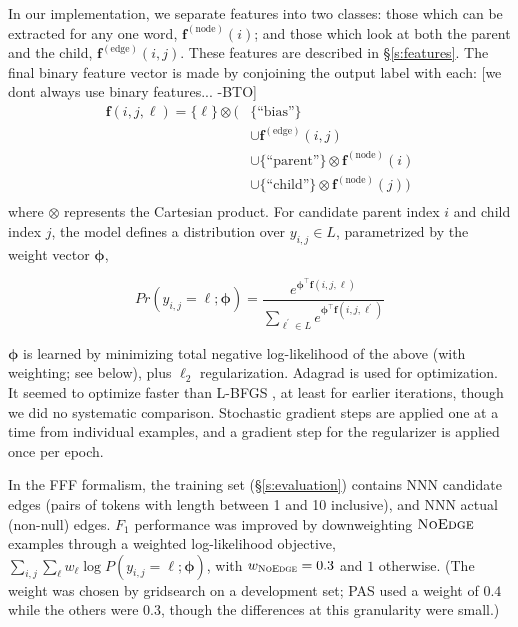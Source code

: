 \documentclass[11pt]{article}
\newcommand{\bocomment}[1]{\textcolor{Bittersweet}{[#1 -BTO]}}
\newcommand{\noedge}{\textsc{NoEdge}}
\begin{document}
In our implementation, we separate features into two classes:
those which can be extracted for any one word, $\bm{f}^{(\text{node})}(i)$;
and those which look at both the parent and the child,
$\bm{f}^{(\text{edge})}(i, j)$.
These features are described in \S\ref{s:features}.
The final binary feature vector is made by conjoining the output label with
each:
\bocomment{we dont always use binary features...}
\begin{align*} 
\bm{f}(i, j, \ell) =
\{ \ell \} \otimes (& 
	\{ \text{``bias''} \} \\
	& \cup \bm{f}^{(\text{edge})}(i, j) \\
	& \cup \{ \text{``parent''} \} \otimes \bm{f}^{(\text{node})}(i) \\
	& \cup \{ \text{``child''} \} \otimes \bm{f}^{(\text{node})}(j)
)\\
\end{align*}
\noindent
where  $\otimes$ represents the Cartesian product.
For candidate parent index $i$ and child index $j$, the model defines a
distribution over $y_{i,j} \in L$, parametrized by the weight vector $\bm\phi$,

\begin{equation}
  Pr(y_{i,j}=\ell; \bm\phi)  = \frac{
  	e^{\bm\phi^\top \bm{f}(i, j, \ell)}
  } {
  	\sum_{\ell^\prime \in L} {
  		e^{\bm\phi^\top \bm{f}(i, j, \ell^\prime)}
  	}
  }
\end{equation}

\noindent
$\bm\phi$ is learned by minimizing total negative log-likelihood of the above
(with weighting; see below), plus $\ell_2$ regularization.
Adagrad \cite{duchi_adaptive_2011} is used for optimization.
It seemed to optimize faster than L-BFGS \cite{byrd_limited_1995}, at least for earlier
iterations, though we did no systematic comparison. Stochastic gradient steps are applied one at a time from individual examples, and a gradient step for the regularizer is applied once per epoch.

In the FFF formalism, the training set (\S\ref{s:evaluation})
contains NNN candidate edges (pairs of tokens with length between 1 and 10 inclusive),
and NNN actual (non-null) edges.  $F_1$ performance was improved by
downweighting $\noedge$ examples through a weighted log-likelihood objective,
$\sum_{i,j} \sum_\ell w_\ell \log P(y_{i,j}=\ell; \bm\phi)$, with $w_{\noedge}=0.3$
and $1$ otherwise.
(The weight was chosen by gridsearch on a development set; 
PAS used a weight of $0.4$ while the others were $0.3$, though the differences at this granularity were small.)
\end{document}
